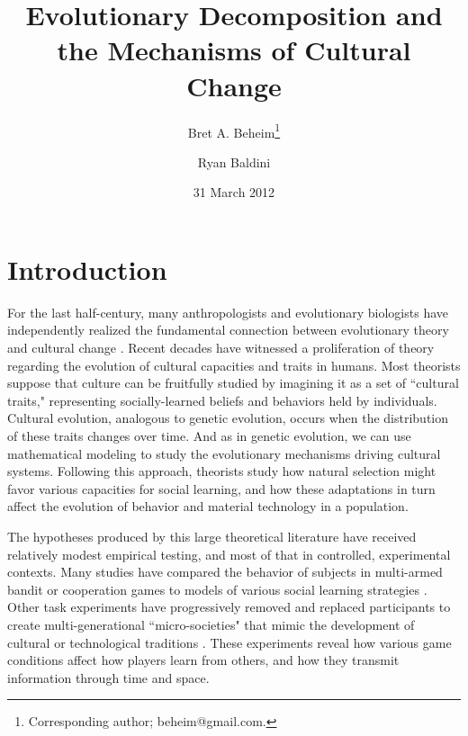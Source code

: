 \documentclass[11pt]{article}
\title{Evolutionary Decomposition and the Mechanisms of Cultural Change}
\author[,    1]{Bret A. Beheim\footnote{Corresponding author; beheim@gmail.com.}}
\author[1]{Ryan Baldini}
\affil[1]{Graduate Group in Ecology, Department of Environmental Science and Policy, University of California, Davis, USA}
\date{31 March 2012}
\begin{document}
\maketitle

\setlength{\parindent}{30pt}
\section{Introduction}
   
For the last half-century, many anthropologists and evolutionary biologists have independently realized the fundamental connection between evolutionary theory and cultural change \citep{campbell1965variation, cavalli1981cultural, boyd1985culture, durham1992coevolution, lumsden2005genes, dawkins2006selfish}. Recent decades have witnessed a proliferation of theory regarding the evolution of cultural capacities and traits in humans. Most theorists suppose that culture can be fruitfully studied by imagining it as a set of ``cultural traits," representing socially-learned beliefs and behaviors held by individuals. Cultural evolution, analogous to genetic evolution, occurs when the distribution of these traits changes over time. And as in genetic evolution, we can use mathematical modeling to study the evolutionary mechanisms driving cultural systems. Following this approach, theorists study how natural selection might favor various capacities for social learning, and how these adaptations in turn affect the evolution of behavior and material technology in a population. 

The hypotheses produced by this large theoretical literature have received relatively modest empirical testing, and most of that in controlled, experimental contexts. Many studies have compared the behavior of subjects in multi-armed bandit or cooperation games to models of various social learning strategies \citep{mcelreath2005applying, efferson2007learning, efferson2008conformists, mcelreath2008beyond, mesoudi2008cultural, eriksson2009people, rendell2011copying}. Other task experiments have progressively removed and replaced participants to create multi-generational ``micro-societies" that mimic the development of cultural or technological traditions \citep{baum2004cultural, caldwell2008studying}.  These experiments reveal how various game conditions affect how players learn from others, and how they transmit information through time and space.
\end{document}

